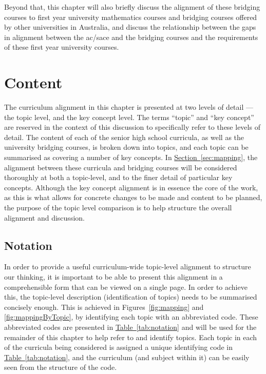 \documentclass[twoside,12pt,a4paper]{report}
\newcommand{\refsec}[1]{\hyperref[sec:#1]{Section~\ref{sec:#1}}}
\newcommand{\reftab}[1]{\hyperref[tab:#1]{Table~\ref{tab:#1}}}
\begin{document}
Beyond that, this chapter will also briefly discuss the alignment of these bridging courses to first year university mathematics courses and bridging courses offered by other universities in Australia, and discuss the relationship between the gaps in alignment between the \gls{ac}/\gls{sace} and the bridging courses and the requirements of these first year university courses. 



\section{Content}
\label{sec:content}

The curriculum alignment in this chapter is presented at two levels of detail --- the topic level, and the key concept level. The terms ``topic'' and ``key concept'' are reserved in the context of this discussion to specifically refer to these levels of detail. The content of each of the senior high school curricula, as well as the university bridging courses, is broken down into topics, and each topic can be summarised as covering a number of key concepts. In \refsec{mapping}, the alignment between these curricula and bridging courses will be considered thoroughly at both a topic-level, and to the finer detail of particular key concepts. Although the key concept alignment is in essence the core of the work, as this is what allows for concrete changes to be made and content to be planned, the purpose of the topic level comparison is to help structure the overall alignment and discussion. 

\subsection{Notation}

In order to provide a useful curriculum-wide topic-level alignment to structure our thinking, it is important to be able to present this alignment in a comprehensible form that can be viewed on a single page. In order to achieve this, the topic-level description (identification of topics) needs to be summarised concisely enough. This is achieved in Figures~\ref{fig:mapping} and \ref{fig:mappingByTopic}, by identifying each topic with an abbreviated code. These abbreviated codes are presented in \reftab{notation} and will be used for the remainder of this chapter to help refer to and identify topics. Each topic in each of the curricula being considered is assigned a unique identifying code in \reftab{notation}, and the curriculum (and subject within it) can be easily seen from the structure of the code.
\end{document}
